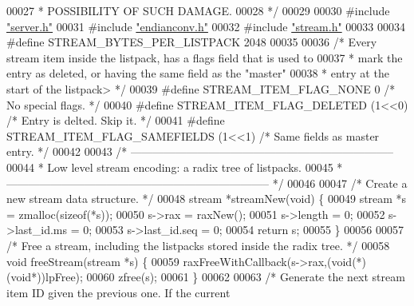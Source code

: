 \begin{DoxyCode}
00027 \textcolor{comment}{ * POSSIBILITY OF SUCH DAMAGE.}
00028 \textcolor{comment}{ */}
00029 
00030 \textcolor{preprocessor}{#}\textcolor{preprocessor}{include} \hyperlink{server_8h}{"server.h"}
00031 \textcolor{preprocessor}{#}\textcolor{preprocessor}{include} \hyperlink{endianconv_8h}{"endianconv.h"}
00032 \textcolor{preprocessor}{#}\textcolor{preprocessor}{include} \hyperlink{stream_8h}{"stream.h"}
00033 
00034 \textcolor{preprocessor}{#}\textcolor{preprocessor}{define} \textcolor{preprocessor}{STREAM\_BYTES\_PER\_LISTPACK} 2048
00035 
00036 \textcolor{comment}{/* Every stream item inside the listpack, has a flags field that is used to}
00037 \textcolor{comment}{ * mark the entry as deleted, or having the same field as the "master"}
00038 \textcolor{comment}{ * entry at the start of the listpack> */}
00039 \textcolor{preprocessor}{#}\textcolor{preprocessor}{define} \textcolor{preprocessor}{STREAM\_ITEM\_FLAG\_NONE} 0             \textcolor{comment}{/* No special flags. */}
00040 \textcolor{preprocessor}{#}\textcolor{preprocessor}{define} \textcolor{preprocessor}{STREAM\_ITEM\_FLAG\_DELETED} \textcolor{preprocessor}{(}1\textcolor{preprocessor}{<<}0\textcolor{preprocessor}{)}     \textcolor{comment}{/* Entry is delted. Skip it. */}
00041 \textcolor{preprocessor}{#}\textcolor{preprocessor}{define} \textcolor{preprocessor}{STREAM\_ITEM\_FLAG\_SAMEFIELDS} \textcolor{preprocessor}{(}1\textcolor{preprocessor}{<<}1\textcolor{preprocessor}{)}  \textcolor{comment}{/* Same fields as master entry. */}
00042 
00043 \textcolor{comment}{/* -----------------------------------------------------------------------}
00044 \textcolor{comment}{ * Low level stream encoding: a radix tree of listpacks.}
00045 \textcolor{comment}{ * ----------------------------------------------------------------------- */}
00046 
00047 \textcolor{comment}{/* Create a new stream data structure. */}
00048 stream *streamNew(\textcolor{keywordtype}{void}) \{
00049     stream *s = zmalloc(\textcolor{keyword}{sizeof}(*s));
00050     s->rax = raxNew();
00051     s->length = 0;
00052     s->last\_id.ms = 0;
00053     s->last\_id.seq = 0;
00054     \textcolor{keywordflow}{return} s;
00055 \}
00056 
00057 \textcolor{comment}{/* Free a stream, including the listpacks stored inside the radix tree. */}
00058 \textcolor{keywordtype}{void} freeStream(stream *s) \{
00059     raxFreeWithCallback(s->rax,(\textcolor{keywordtype}{void}(*)(\textcolor{keywordtype}{void}*))lpFree);
00060     zfree(s);
00061 \}
00062 
00063 \textcolor{comment}{/* Generate the next stream item ID given the previous one. If the current}

\end{DoxyCode}
